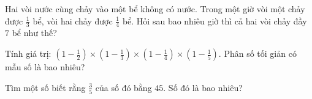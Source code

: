 \begin{ex}
  Hai vòi nước cùng chảy vào một bể không có nước. Trong một giờ vòi một chảy được $\frac{1}{3}$ bể, vòi hai chảy được $\frac{1}{4}$ bể. Hỏi sau bao nhiêu giờ thì cả hai vòi chảy đầy $7$ bể như thế?
\end{ex}

\begin{ex}
  Tính giá trị: $(1 - \frac{1}{2}) \times (1 - \frac{1}{3}) \times (1 - \frac{1}{4}) \times (1 - \frac{1}{5})$. Phân số tối giản có mẫu số là bao nhiêu?
\end{ex}

\begin{ex}
  Tìm một số biết rằng $\frac{3}{5}$ của số đó bằng $45$. Số đó là bao nhiêu?
\end{ex}
